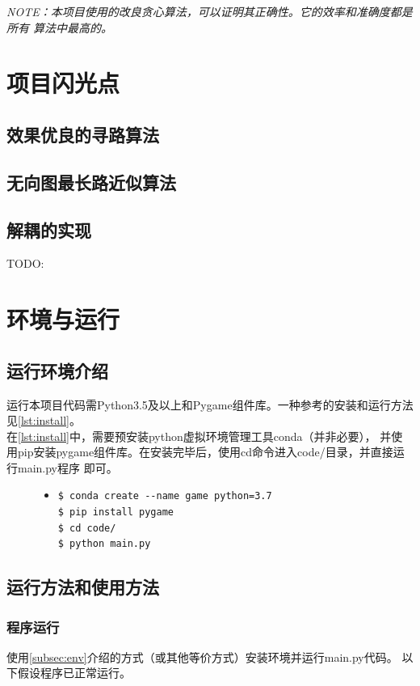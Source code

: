 \documentclass[a4paper]{article}
\begin{document}
\emph{NOTE：本项目使用的改良贪心算法，可以证明其正确性。它的效率和准确度都是所有
算法中最高的。}
\section{项目闪光点}
\subsection{效果优良的寻路算法}
\subsection{无向图最长路近似算法}
\subsection{解耦的实现}
TODO:
\section{环境与运行}
\subsection{运行环境介绍}\label{subsec:env}
运行本项目代码需Python3.5及以上和Pygame组件库。一种参考的安装和运行方法
见\autoref{lst:install}。\\

在\autoref{lst:install}中，需要预安装python虚拟环境管理工具conda（并非必要），
并使用pip安装pygame组件库。在安装完毕后，使用cd命令进入code/目录，并直接运行main.py程序
即可。

\begin{figure}[!hbt]
\begin{itemize}
\item[] \begin{lstlisting}[style=myshell, label=lst:install, caption=安装运行环境的参考方法]
$ conda create --name game python=3.7 
$ pip install pygame
$ cd code/
$ python main.py
\end{lstlisting}
\end{itemize}
\end{figure}

\subsection{运行方法和使用方法}
\subsubsection{程序运行}
使用\autoref{subsec:env}介绍的方式（或其他等价方式）安装环境并运行main.py代码。
以下假设程序已正常运行。
\end{document}
